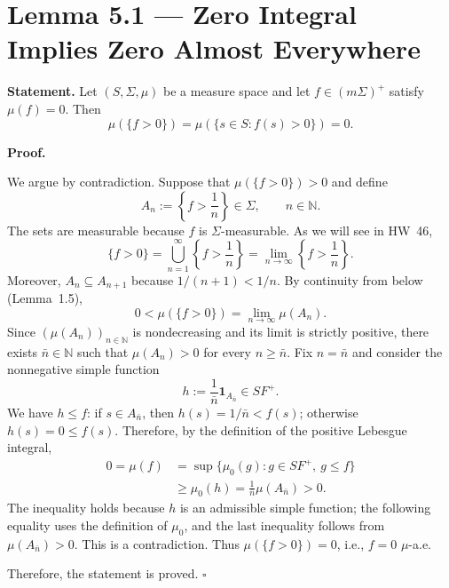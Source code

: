 \documentclass[11pt,a4paper]{article}
\begin{document}
\section*{\textcolor{PFFBlue}{Lemma 5.1 --- Zero Integral Implies Zero Almost Everywhere}}

\textbf{Statement.} Let $(S,\Sigma,\mu)$ be a measure space and let
$f\in(m\Sigma)^+$ satisfy $\mu(f)=0$. Then
\[
\mu(\{f>0\})=\mu(\{s\in S:f(s)>0\})=0.
\]

\textbf{Proof.}\par
We argue by contradiction. Suppose that $\mu(\{f>0\})>0$ and define
\[
A_n:=\left\{f>\frac1n\right\}\in\Sigma,\qquad n\in\mathbb N.
\]
The sets are measurable because $f$ is $\Sigma$-measurable. As we will see in
HW~46,
\[
\{f>0\}
=\bigcup_{n=1}^{\infty}\left\{f>\frac1n\right\}
=\lim_{n\to\infty}\left\{f>\frac1n\right\}.
\]
Moreover, $A_n\subseteq A_{n+1}$ because $1/(n+1)<1/n$. By continuity
from below (Lemma~1.5),
\[
0<\mu(\{f>0\})=\lim_{n\to\infty}\mu(A_n).
\]
Since $(\mu(A_n))_{n\in\mathbb N}$ is nondecreasing and its limit is
strictly positive, there exists $\bar n\in\mathbb N$ such that
$\mu(A_n)>0$ for every $n\ge\bar n$. Fix $n=\bar n$ and consider the
nonnegative simple function
\[
h:=\frac1{\bar n}\mathbf1_{A_{\bar n}}\in SF^+.
\]
We have $h\le f$: if $s\in A_{\bar n}$, then
$h(s)=1/\bar n<f(s)$; otherwise $h(s)=0\le f(s)$.
Therefore, by the definition of the positive Lebesgue integral,
\[
\begin{aligned}
0=\mu(f)
&=\sup\{\mu_0(g):g\in SF^+,\ g\le f\}\\
&\ge\mu_0(h)
=\frac1{\bar n}\mu(A_{\bar n})>0.
\end{aligned}
\]
The inequality holds because $h$ is an admissible simple function; the
following equality uses the definition of $\mu_0$, and the last inequality
follows from $\mu(A_{\bar n})>0$. This is a contradiction. Thus
$\mu(\{f>0\})=0$, i.e., $f=0$ $\mu$-a.e.

Therefore, the statement is proved. $\square$
\end{document}
